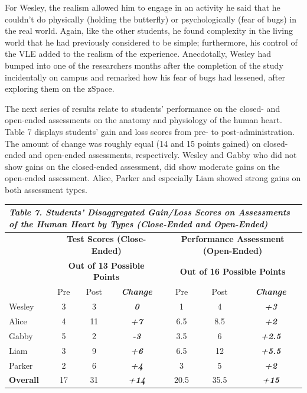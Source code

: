 \documentclass[11.5pt]{sig-alternate} %
\begin{document}
\begin{large}
For Wesley, the realism allowed him to engage in an activity he said that he couldn’t do physically (holding the butterfly) or psychologically (fear of bugs) in the real world.  Again, like the other students, he found complexity in the living world that he had previously considered to be simple; furthermore, his control of the VLE added to the realism of the experience. Anecdotally, Wesley had bumped into one of the researchers months after the completion of the study incidentally on campus and remarked how his fear of bugs had lessened, after exploring them on the zSpace.

The next series of results relate to students’ performance on the closed- and open-ended assessments on the anatomy and physiology of the human heart. Table 7 displays students’ gain and loss scores from pre- to post-administration. The amount of change was roughly equal (14 and 15 points gained) on closed-ended and open-ended assessments, respectively. Wesley and Gabby who did not show gains on the closed-ended assessment, did show moderate gains on the open-ended assessment. Alice, Parker and especially Liam showed strong gains on both assessment types.  

\begin{table}
\begin{tabular}[t]{lccc|ccc}
\hline
\multicolumn{7}{l}{\textit{\textbf{Table 7.} Students' Disaggregated Gain/Loss Scores on Assessments of the Human Heart by Types (Close-Ended and Open-Ended)}} \\
\hline
 & \multicolumn{3}{c|}{\textbf{Test Scores (Close-Ended)}} & \multicolumn{3}{c}{\textbf{Performance Assessment (Open-Ended)}} \\
 & \multicolumn{3}{c|}{\textbf{Out of 13 Possible Points}} & \multicolumn{3}{c}{\textbf{Out of 16 Possible Points}} \\
 \cline{2-7}
 & Pre & Post & \textbf{\textit{Change}} & Pre & Post & \textbf{\textit{Change}} \\
 \cline{2-7}
Wesley & 3 & 3 & \textbf{\textit{0}} & 1 & 4 & \textbf{\textit{+3}}\\
Alice & 4 & 11 & \textbf{\textit{+7}} & 6.5 & 8.5 & \textbf{\textit{+2}} \\
Gabby & 5 & 2 & \textbf{\textit{-3}} & 3.5 & 6 & \textbf{\textit{+2.5}} \\
Liam & 3 & 9 & \textbf{\textit{+6}} & 6.5 & 12 & \textbf{\textit{+5.5}} \\
Parker & 2 & 6 & \textbf{\textit{+4}} & 3 & 5 & \textbf{\textit{+2}} \\
\hline
\textbf{Overall} & 17 & 31 & \textbf{\textit{+14}} & 20.5 & 35.5 & \textbf{\textit{+15}} \\
\hline
\end{tabular}
\end{table}


\end{large}
\end{document}
